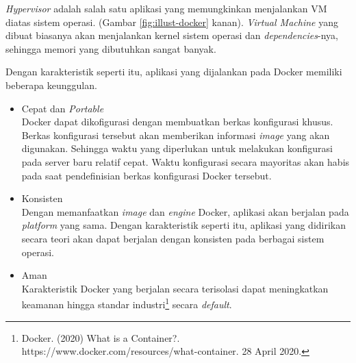     \textit{Hypervisor} adalah salah satu aplikasi yang memungkinkan menjalankan
    VM diatas sistem operasi. (Gambar \ref{fig:illust-docker} kanan).
    \textit{Virtual Machine} yang dibuat biasanya akan menjalankan kernel sistem
    operasi dan \textit{dependencies}-nya, sehingga memori yang dibutuhkan
    sangat banyak.
    
    Dengan karakteristik seperti itu, aplikasi yang dijalankan pada Docker
    memiliki beberapa keunggulan.
    \begin{itemize}
        \item Cepat dan \textit{Portable} \\
            Docker dapat dikofigurasi dengan membuatkan berkas konfigurasi
            khusus. Berkas konfigurasi tersebut akan memberikan informasi
            \textit{image} yang akan digunakan. Sehingga waktu yang diperlukan
            untuk melakukan konfigurasi pada server baru relatif cepat. Waktu
            konfigurasi secara mayoritas akan habis pada saat pendefinisian
            berkas konfigurasi Docker tersebut.
            
        \item Konsisten \\
            Dengan memanfaatkan \textit{image} dan \textit{engine} Docker,
            aplikasi akan berjalan pada \textit{platform} yang sama. Dengan
            karakteristik seperti itu, aplikasi yang didirikan secara teori akan
            dapat berjalan dengan konsisten pada berbagai sistem operasi.
            
        \item Aman \\
            Karakteristik Docker yang berjalan secara terisolasi dapat
            meningkatkan keamanan hingga standar
            industri\footnote{Docker. (2020) What is a Container?.
            https://www.docker.com/resources/what-container. 28 April 2020.} 
            secara \textit{default}.
    \end{itemize}
    